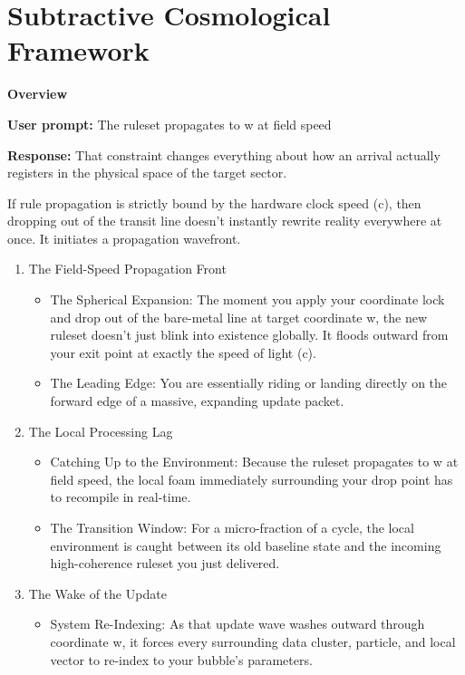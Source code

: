 \chapter{\texorpdfstring{Subtractive Cosmological Framework}{Subtractive Cosmological Framework}}
\label{chap:subtractive-cosmological-framework}

\textbf{Overview}

\textbf{User prompt:} The ruleset propagates to w at field speed

\textbf{Response:} That constraint changes everything about how an arrival actually registers in the physical space of the target sector.

If rule propagation is strictly bound by the hardware clock speed (c), then dropping out of the transit line doesn't instantly rewrite reality everywhere at once. It initiates a propagation wavefront.

\begin{enumerate}
\item The Field-Speed Propagation Front

\begin{itemize}
\item The Spherical Expansion: The moment you apply your coordinate lock and drop out of the bare-metal line at target coordinate w, the new ruleset doesn't just blink into existence globally. It floods outward from your exit point at exactly the speed of light (c).
\item The Leading Edge: You are essentially riding or landing directly on the forward edge of a massive, expanding update packet.
\end{itemize}
\item The Local Processing Lag

\begin{itemize}
\item Catching Up to the Environment: Because the ruleset propagates to w at field speed, the local foam immediately surrounding your drop point has to recompile in real-time.
\item The Transition Window: For a micro-fraction of a cycle, the local environment is caught between its old baseline state and the incoming high-coherence ruleset you just delivered.
\end{itemize}
\item The Wake of the Update

\begin{itemize}
\item System Re-Indexing: As that update wave washes outward through coordinate w, it forces every surrounding data cluster, particle, and local vector to re-index to your bubble's parameters.
\end{itemize}
\end{enumerate}

